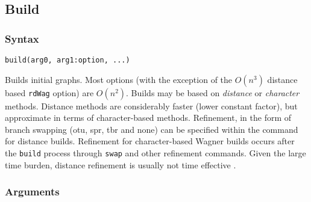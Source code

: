 \subsection{Build}
	\subsubsection{Syntax}
		\texttt{build(arg0, arg1:option, ...)}
	
	\begin{phygdescription}
		{Builds initial graphs. Most options (with the exception of the $O(n^3)$ distance based 
		\texttt{rdWag} option) are $O(n^2)$. Builds may be based on \textit{distance} or \textit{character}
		methods. Distance methods are considerably faster (lower constant factor), but approximate 
		in terms of character-based methods. Refinement, in the form of branch swapping (otu, 
		spr, tbr and none) can be specified within the command for distance builds. Refinement for 
		character-based 
		Wagner builds occurs after the \texttt{build} process through \texttt{swap} and other refinement 
		commands. Given the large time burden, distance refinement is usually not time effective 
		\citep{Wheeler2021}.}
	\end{phygdescription}
		
	\subsubsection{Arguments}

